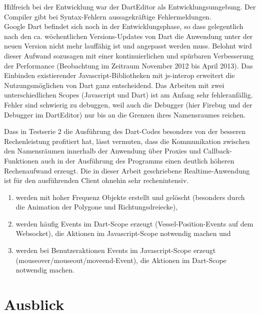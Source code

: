 Hilfreich bei der Entwicklung war der DartEditor als Entwicklungsumgebung. Der Compiler gibt bei Syntax-Fehlern aussagekräftige Fehlermeldungen.\\  
Google Dart befindet sich noch in der Entwicklungsphase, so dass gelegentlich nach den ca. wöchentlichen Versions-Updates von Dart die Anwendung unter der neuen Version nicht mehr lauffähig ist und angepasst werden muss. Belohnt wird dieser Aufwand sozusagen mit einer kontinuierlichen und spürbaren Verbesserung der Performance (Beobachtung im Zeitraum November 2012 bis April 2013).
Das Einbinden existierender Javascript-Bibliotheken mit js-interop erweitert die Nutzungsmöglichen von Dart ganz entscheidend. Das Arbeiten mit zwei unterschiedlichen Scopes (Javascript und Dart) ist am Anfang sehr fehleranfällig. Fehler sind schwierig zu debuggen, weil auch die Debugger (hier Firebug und der Debugger im DartEditor) nur bis an die Grenzen ihres Namensraumes reichen.

Dass in Testserie 2 die Ausführung des Dart-Codes besonders von der besseren Rechenleistung profitiert hat, lässt vermuten, dass die Kommunikation zwischen den Namensräumen innerhalb der Anwendung über Proxies und Callback-Funktionen auch in der Ausführung des Programms einen deutlich höheren Rechenaufwand erzeugt.
Die in dieser Arbeit geschriebene Realtime-Anwendung ist für den ausführenden Client ohnehin sehr rechenintensiv.
\begin{enumerate}
\item werden mit hoher Frequenz Objekte erstellt und gelöscht (besonders durch die Animation der Polygone und Richtungsdreiecke), 
\item werden häufig Events im Dart-Scope erzeugt (Vessel-Position-Events auf dem Websocket), die Aktionen im Javascript-Scope notwendig machen und
\item werden bei Benutzeraktionen Events im Javascript-Scope erzeugt (mouseover/mouseout/moveend-Event), die Aktionen im Dart-Scope notwendig machen.
\end{enumerate}

\section{Ausblick}

